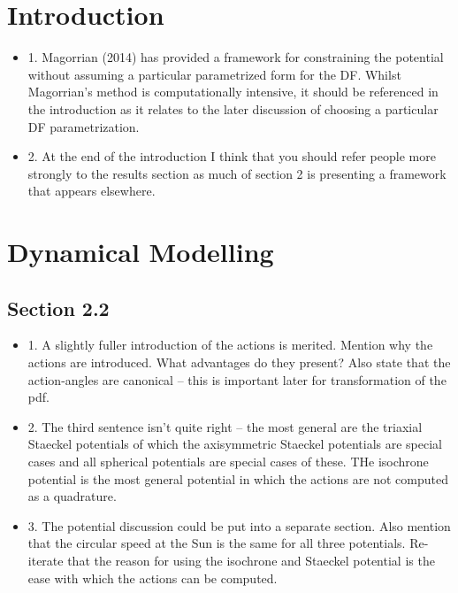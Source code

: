 \documentclass[10pt,a4paper]{article}
\begin{document}
\section{Introduction}
\begin{itemize}
\item 1. Magorrian (2014) has provided a framework for constraining the potential without assuming a particular parametrized form for the DF. Whilst Magorrian's method is computationally intensive, it should be referenced in the introduction as it relates to the later discussion of choosing a particular DF parametrization.
\item 2. At the end of the introduction I think that you should refer people more strongly to the results section as much of section 2 is presenting a framework that appears elsewhere.
\end{itemize}

\section{Dynamical Modelling}

\subsection{Section 2.2}
\begin{itemize}
\item 1. A slightly fuller introduction of the actions is merited. Mention why the actions are introduced. What advantages do they present? Also state that the action-angles are canonical -- this is important later for transformation of the pdf.
\item 2. The third sentence isn't quite right -- the most general are the triaxial
Staeckel potentials of which the axisymmetric Staeckel potentials are special cases
and all spherical potentials are special cases of these. THe isochrone potential is
the most general potential in which the actions are not computed as a quadrature.
\item 3. The potential discussion could be put into a separate section. Also mention that the circular speed at the Sun is the same for all three potentials. Re-iterate that the reason for using the isochrone and Staeckel potential is the ease with which the actions can be computed.
\end{itemize}
\end{document}
